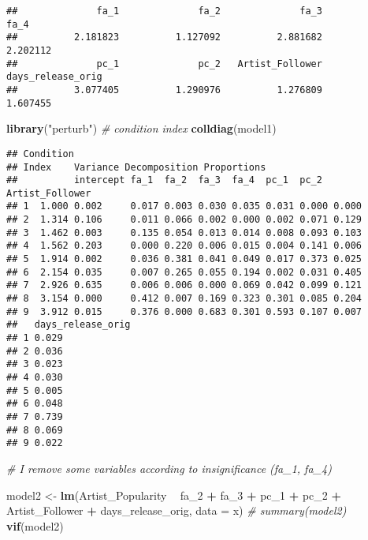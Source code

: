 \documentclass[
]{article}
\newenvironment{Shaded}{\begin{snugshade}}{\end{snugshade}}
\newcommand{\CommentTok}[1]{\textcolor[rgb]{0.56,0.35,0.01}{\textit{#1}}}
\newcommand{\DataTypeTok}[1]{\textcolor[rgb]{0.13,0.29,0.53}{#1}}
\newcommand{\DecValTok}[1]{\textcolor[rgb]{0.00,0.00,0.81}{#1}}
\newcommand{\KeywordTok}[1]{\textcolor[rgb]{0.13,0.29,0.53}{\textbf{#1}}}
\newcommand{\NormalTok}[1]{#1}
\newcommand{\OperatorTok}[1]{\textcolor[rgb]{0.81,0.36,0.00}{\textbf{#1}}}
\newcommand{\StringTok}[1]{\textcolor[rgb]{0.31,0.60,0.02}{#1}}
\begin{document}
\begin{verbatim}
##              fa_1              fa_2              fa_3              fa_4 
##          2.181823          1.127092          2.881682          2.202112 
##              pc_1              pc_2   Artist_Follower days_release_orig 
##          3.077405          1.290976          1.276809          1.607455
\end{verbatim}

\begin{Shaded}
\begin{Highlighting}[]
\KeywordTok{library}\NormalTok{(}\StringTok{"perturb"}\NormalTok{) }\CommentTok{# condition index}
\KeywordTok{colldiag}\NormalTok{(model1)}
\end{Highlighting}
\end{Shaded}

\begin{verbatim}
## Condition
## Index    Variance Decomposition Proportions
##          intercept fa_1  fa_2  fa_3  fa_4  pc_1  pc_2  Artist_Follower
## 1  1.000 0.002     0.017 0.003 0.030 0.035 0.031 0.000 0.000          
## 2  1.314 0.106     0.011 0.066 0.002 0.000 0.002 0.071 0.129          
## 3  1.462 0.003     0.135 0.054 0.013 0.014 0.008 0.093 0.103          
## 4  1.562 0.203     0.000 0.220 0.006 0.015 0.004 0.141 0.006          
## 5  1.914 0.002     0.036 0.381 0.041 0.049 0.017 0.373 0.025          
## 6  2.154 0.035     0.007 0.265 0.055 0.194 0.002 0.031 0.405          
## 7  2.926 0.635     0.006 0.006 0.000 0.069 0.042 0.099 0.121          
## 8  3.154 0.000     0.412 0.007 0.169 0.323 0.301 0.085 0.204          
## 9  3.912 0.015     0.376 0.000 0.683 0.301 0.593 0.107 0.007          
##   days_release_orig
## 1 0.029            
## 2 0.036            
## 3 0.023            
## 4 0.030            
## 5 0.005            
## 6 0.048            
## 7 0.739            
## 8 0.069            
## 9 0.022
\end{verbatim}

\begin{Shaded}
\begin{Highlighting}[]
\CommentTok{# I remove some variables according to insignificance (fa_1, fa_4)}

\NormalTok{model2 <-}\StringTok{ }\KeywordTok{lm}\NormalTok{(Artist_Popularity }\OperatorTok{~}\StringTok{ }\NormalTok{fa_}\DecValTok{2} \OperatorTok{+}\StringTok{ }\NormalTok{fa_}\DecValTok{3} \OperatorTok{+}\StringTok{ }\NormalTok{pc_}\DecValTok{1} \OperatorTok{+}\StringTok{ }\NormalTok{pc_}\DecValTok{2} \OperatorTok{+}\StringTok{ }\NormalTok{Artist_Follower }\OperatorTok{+}\StringTok{ }\NormalTok{days_release_orig, }\DataTypeTok{data =}\NormalTok{ x)}
\CommentTok{# summary(model2)}
\KeywordTok{vif}\NormalTok{(model2)}
\end{Highlighting}
\end{Shaded}
\end{document}
